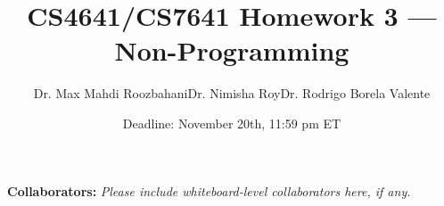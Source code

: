 \documentclass{article}
\title{CS4641/CS7641 Homework 3 — Non-Programming}
\author{Dr. Max Mahdi Roozbahani\hspace{1cm}Dr. Nimisha Roy\hspace{1cm}Dr. Rodrigo Borela Valente}
\date{Deadline: November 20th, 11:59 pm ET}
\begin{document}
\maketitle

\textbf{Collaborators:} \textit{Please include whiteboard-level collaborators here, if any.}
\newpage


\newpage


\newpage


\newpage


\newpage


\newpage


\newpage
\end{document}

